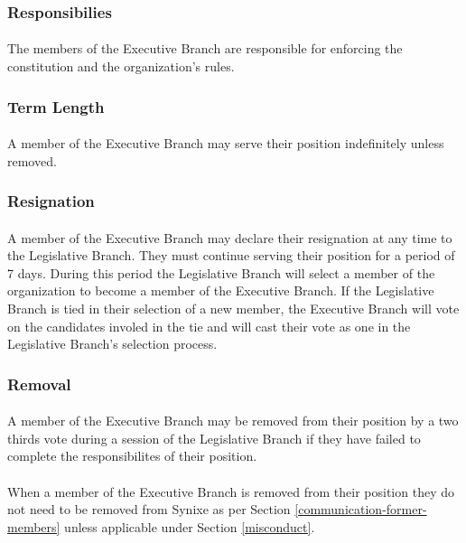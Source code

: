 \documentclass[10pt,a4paper]{article}
\begin{document}
\subsubsection{Responsibilies}
\paragraph{}
The members of the Executive Branch are responsible for enforcing the constitution and the organization's rules.
\subsubsection{Term Length}
\paragraph{}
A member of the Executive Branch may serve their position indefinitely unless removed.
\subsubsection{Resignation}
\paragraph{}
A member of the Executive Branch may declare their resignation at any time to the Legislative Branch. They must continue serving their position for a period of 7 days. During this period the Legislative Branch will select a member of the organization to become a member of the Executive Branch. If the Legislative Branch is tied in their selection of a new member, the Executive Branch will vote on the candidates involed in the tie and will cast their vote as one in the Legislative Branch's selection process.
\subsubsection{Removal}
\paragraph{}
A member of the Executive Branch may be removed from their position by a two thirds vote during a session of the Legislative Branch if they have failed to complete the responsibilites of their position.
\paragraph{}
When a member of the Executive Branch is removed from their position they do not need to be removed from Synixe as per Section \ref{communication-former-members} unless applicable under Section \ref{misconduct}.
\end{document}
